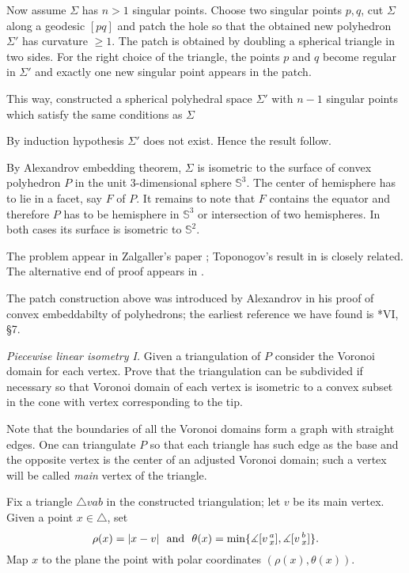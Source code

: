 Now assume $\Sigma$ has $n>1$ singular points.
Choose two singular points $p, q$,
cut $\Sigma$ along a geodesic $[pq]$
and patch the hole so that the obtained new polyhedron $\Sigma'$ has curvature $\ge 1$.
The patch is obtained by doubling a
spherical triangle in two sides.
For the right choice of the triangle,
the points $p$ and $q$ become regular in $\Sigma'$
and exactly one new singular point appears in the patch.

This way, constructed a  spherical polyhedral space $\Sigma'$
with $n-1$ singular points which satisfy the same conditions as $\Sigma$ 

By induction hypothesis $\Sigma'$ does not exist. Hence the result follow.

By Alexandrov embedding theorem, $\Sigma$ is isometric to the surface of convex polyhedron $P$ in the unit 3-dimensional sphere $\mathbb S^3$. 
The center of hemisphere has to lie in a facet, say $F$ of $P$.
It remains to note that $F$ contains the equator and therefore $P$ has to be hemisphere in $\mathbb S^3$ or intersection of two hemispheres.
In both cases its surface is isometric to $\mathbb S^2$.

The problem appear in Zalgaller's paper \cite{zalgaller-shperical-polygon};
Toponogov's result in \cite{toponogov} is closely related.
The alternative end of proof appears in \cite{panov-petrunin}.

The patch construction above was introduced by Alexandrov
in his proof of convex embeddabilty of polyhedrons;
the earliest reference we have found is
\cite{alexandrov1948}*{VI, \S7}.




\textit{Piecewise linear isometry {\rm I}.}
Given a triangulation of $P$
consider the Voronoi domain for each vertex.
Prove that the triangulation can be subdivided if necessary
so that Voronoi domain of each vertex is isometric to a convex subset in the cone with vertex corresponding to the tip.

Note that the boundaries of all the Voronoi domains form a graph with straight edges.
One can triangulate $P$ so that each triangle has such edge as the base 
and the opposite vertex is the center of an adjusted Voronoi domain; such a vertex will be called \emph{main} vertex of the triangle.

Fix a triangle $\triangle vab$ in the constructed triangulation; 
let $v$ be its main vertex.
Given a point 
$x\in  \triangle$, set 
\[\rho(x)=|x-v|\ \ \text{and}\ \  \theta(x)=\min \{\measuredangle \hinge vax,\measuredangle\hinge vbx\}.\]
Map $x$ to the plane the point with polar coordinates $(\rho(x),\theta(x))$.

